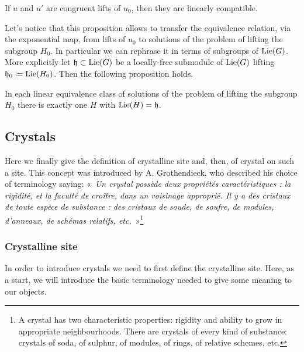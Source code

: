 \begin{lem}\label{lem:CongruentLinComp}
	If $u$ and $u'$ are congruent lifts of $u_0$, then
	they are linearly compatible.
\end{lem} 


\begin{rem}[]
	Let's notice that this proposition allows to
	transfer the equivalence relation, via the exponential map,
	from lifts of $u_0$ to solutions of the problem of lifting
	the subgroup $H_0$.
	In particular we can rephrase it in terms of subgroups
	of $\operatorname{Lie}(G)$. More explicitly
	let $\mathfrak{h} \subset \operatorname{Lie}(G)$ be a locally-free
	submodule of $\operatorname{Lie}(G)$ lifting
	$\mathfrak{h}_0 \coloneqq \operatorname{Lie}(H_0)$.
	Then the following proposition holds.
\end{rem}


\begin{prop}\label{prop:equivClassFiltration}
	In each linear equivalence class of solutions of
	the problem of lifting the subgroup $H_0$
	there is exactly one $H$ with 
	$\operatorname{Lie}(H) = \mathfrak{h}$.
\end{prop}



\subsection{Crystals}
Here we finally give the definition of crystalline site and, then, of
crystal on such a site.
This concept was introduced by A. Grothendieck, 
who described his choice of terminology saying:
«~\emph{Un crystal possède deux propriétés caractéristiques : la rigidité, 
et la faculté de croître, dans un voisinage approprié. 
Il y a des cristaux de toute espèce de substance : des cristaux de soude, 
de soufre, de modules, d'anneaux, de schémas relatifs, etc.}~»\footnote{A
crystal has two characteristic properties: rigidity and ability to grow
in appropriate neighbourhoods.
There are crystals of every kind of substance: crystals of soda, of sulphur,
of modules, of rings, of relative schemes, etc.}



\subsubsection{Crystalline site}
In order to introduce crystals we need to first define the crystalline site.
Here, as a start, we will introduce the basic terminology needed to give
some meaning to our objects.


